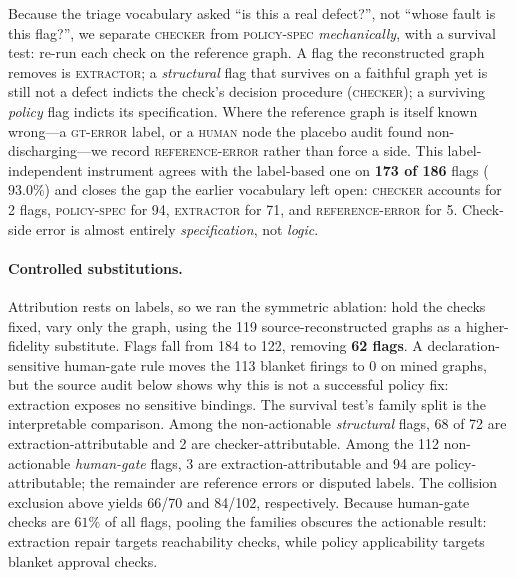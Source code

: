 Because the triage vocabulary asked ``is this a real defect?'', not ``whose
fault is this flag?'', we separate \textsc{checker} from \textsc{policy-spec}
\emph{mechanically}, with a survival test: re-run each check on the reference
graph. A flag the reconstructed graph removes is \textsc{extractor}; a \emph{structural}
flag that survives on a faithful graph yet is still not a defect indicts the
check's decision procedure (\textsc{checker}); a surviving \emph{policy} flag
indicts its specification. Where the reference graph is itself known wrong---a
\textsc{gt-error} label, or a \textsc{human} node the placebo audit found
non-discharging---we record \textsc{reference-error} rather than force a side.
This label-independent instrument agrees with the label-based one on
\textbf{173 of 186} flags ($93.0\%$) and closes the gap the earlier vocabulary
left open: \textsc{checker} accounts for 2 flags, \textsc{policy-spec} for 94,
\textsc{extractor} for 71, and \textsc{reference-error} for 5. Check-side error
is almost entirely \emph{specification}, not \emph{logic}.

\paragraph{Controlled substitutions.}
Attribution rests on labels, so we ran the symmetric ablation: hold the checks
fixed, vary only the graph, using the 119 source-reconstructed graphs as a
higher-fidelity substitute. Flags fall from 184 to 122, removing \textbf{62
flags}. A declaration-sensitive human-gate rule moves the 113 blanket firings
to 0 on mined graphs, but the source audit below shows why
this is not a successful policy fix: extraction exposes no sensitive bindings.
The survival test's family split is the interpretable comparison. Among the
non-actionable \emph{structural} flags, 68 of 72 are extraction-attributable
and 2 are checker-attributable. Among the 112 non-actionable
\emph{human-gate} flags, 3 are extraction-attributable and 94 are
policy-attributable; the remainder are reference errors or disputed labels.
The collision exclusion above yields 66/70 and 84/102, respectively.
Because human-gate checks are $61\%$
of all flags, pooling the families obscures the actionable result: extraction
repair targets reachability checks, while policy applicability targets blanket
approval checks.


